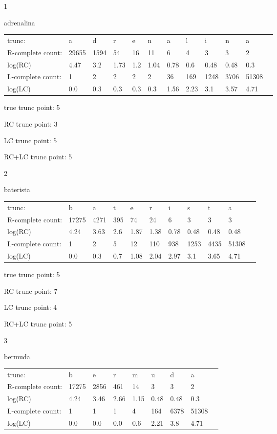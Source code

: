 \documentclass{article}
\begin{document}
1

adrenalina

\begin{tabular}{l|lllllllllll}
trunc: & a & d & r & e & n & a & l & i & n & a & \\ 
R-complete count: & 29655 & 1594 & 54 & 16 & 11 & 6 & 4 & 3 & 3 & 2 & \\ 
log(RC) & 4.47 & 3.2 & 1.73 & 1.2 & 1.04 & 0.78 & 0.6 & 0.48 & 0.48 & 0.3 & \\ 
L-complete count: & 1 & 2 & 2 & 2 & 2 & 36 & 169 & 1248 & 3706 & 51308 & \\ 
log(LC) & 0.0 & 0.3 & 0.3 & 0.3 & 0.3 & 1.56 & 2.23 & 3.1 & 3.57 & 4.71 & \\ 
\end{tabular}

true trunc point: 5

RC trunc point: 3

LC trunc point: 5

RC+LC trunc point: 5

\vspace{1em}

2

baterista

\begin{tabular}{l|llllllllll}
trunc: & b & a & t & e & r & i & s & t & a & \\ 
R-complete count: & 17275 & 4271 & 395 & 74 & 24 & 6 & 3 & 3 & 3 & \\ 
log(RC) & 4.24 & 3.63 & 2.6 & 1.87 & 1.38 & 0.78 & 0.48 & 0.48 & 0.48 & \\ 
L-complete count: & 1 & 2 & 5 & 12 & 110 & 938 & 1253 & 4435 & 51308 & \\ 
log(LC) & 0.0 & 0.3 & 0.7 & 1.08 & 2.04 & 2.97 & 3.1 & 3.65 & 4.71 & \\ 
\end{tabular}

true trunc point: 5

RC trunc point: 7

LC trunc point: 4

RC+LC trunc point: 5

\vspace{1em}

3

bermuda

\begin{tabular}{l|llllllll}
trunc: & b & e & r & m & u & d & a & \\ 
R-complete count: & 17275 & 2856 & 461 & 14 & 3 & 3 & 2 & \\ 
log(RC) & 4.24 & 3.46 & 2.66 & 1.15 & 0.48 & 0.48 & 0.3 & \\ 
L-complete count: & 1 & 1 & 1 & 4 & 164 & 6378 & 51308 & \\ 
log(LC) & 0.0 & 0.0 & 0.0 & 0.6 & 2.21 & 3.8 & 4.71 & \\ 
\end{tabular}
\end{document}

